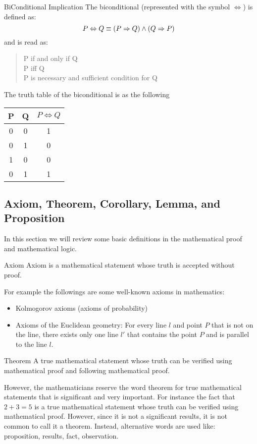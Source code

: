 \begin{defbox}{BiConditional Implication}
	The biconditional (represented with the symbol $\Leftrightarrow$) is defined as:
	\[ P \Leftrightarrow Q \equiv (P \Rightarrow Q) \wedge (Q \Rightarrow P) \]
	and is read as:
	\begin{quote}
		P if and only if Q \\
		P iff Q \\
		P is necessary and sufficient condition for Q
	\end{quote}
	The truth table of the biconditional is as the following
	\begin{center}
	\begin{tabular}{|c|c|c|}
		\hline
		P & Q & $ P \Leftrightarrow Q $ \\
		\hline
		0 & 0 & 1 \\
		\hline
		0 & 1 & 0 \\
		\hline
		1 & 0 & 0 \\
		\hline
		0 & 1 & 1 \\
		\hline
	\end{tabular}
	\end{center}
\end{defbox}


	


\subsection{Axiom, Theorem, Corollary, Lemma, and Proposition }

In this section we will review some basic definitions in the mathematical proof and mathematical logic.

\begin{defbox}{Axiom}
	Axiom is a mathematical statement whose truth is accepted without proof.
\end{defbox}

For example the followings are some well-known axioms in mathematics:

\begin{itemize}
	\item Kolmogorov axioms (axioms of probability)
	\item Axioms of the Euclidean geometry: For every line $l$ and point $P$ that is not on the line, there exists only one line $l'$ that contains the point $P$ and is parallel to the line $l$.
\end{itemize}

\begin{defbox}{Theorem}
	A true mathematical statement whose truth can be verified using mathematical proof and following mathematical proof.
\end{defbox}

However, the mathematicians reserve the word theorem for true mathematical statements that is significant and very important. For instance the fact that $2 + 3 = 5$ is a true mathematical statement whose truth can be verified using mathematical proof. However, since it is not a significant results, it is not common to call it a theorem. Instead, alternative words are used like: proposition, results, fact, observation.  
